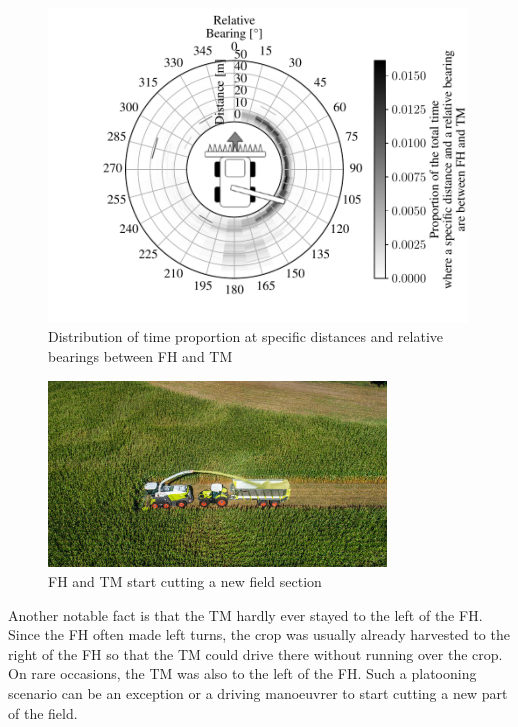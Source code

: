 \documentclass[]{nsm-thesis}
\begin{document}
\begin{figure}%
	\centering
	\includegraphics[width=0.99\textwidth]{figures/bearingHarvestScenario50.pdf}
	\caption{Distribution of time proportion at specific distances and relative bearings between \ac{FH} and \ac{TM}}%
	\label{fig:bearing}%
\end{figure}

\begin{figure}%
	\centering
	\includegraphics[width=0.8\textwidth]{figures/claas_harvest_behind.png}
	\caption{\ac{FH} and \ac{TM} start cutting a new field section}%
	\label{fig:startpart}%
\end{figure}

Another notable fact is that the \ac{TM} hardly ever stayed to the left of the \ac{FH}. Since the \ac{FH} often made left turns, the crop was usually already harvested to the right of the \ac{FH} so that the \ac{TM} could drive there without running over the crop. On rare occasions, the \ac{TM} was also to the left of the \ac{FH}. Such a platooning scenario can be an exception or a driving manoeuvrer to start cutting a new part of the field.   
\end{document}
